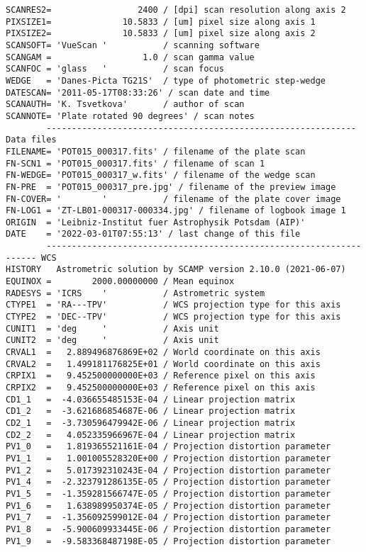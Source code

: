 \documentclass[11pt]{ivoa}
\begin{document}
\begin{lstlisting}
SCANRES2=                 2400 / [dpi] scan resolution along axis 2
PIXSIZE1=              10.5833 / [um] pixel size along axis 1
PIXSIZE2=              10.5833 / [um] pixel size along axis 2
SCANSOFT= 'VueScan '           / scanning software
SCANGAM =                  1.0 / scan gamma value
SCANFOC = 'glass   '           / scan focus
WEDGE   = 'Danes-Picta TG21S'  / type of photometric step-wedge
DATESCAN= '2011-05-17T08:33:26' / scan date and time
SCANAUTH= 'K. Tsvetkova'       / author of scan
SCANNOTE= 'Plate rotated 90 degrees' / scan notes
        ------------------------------------------------------------- Data files
FILENAME= 'POT015_000317.fits' / filename of the plate scan
FN-SCN1 = 'POT015_000317.fits' / filename of scan 1
FN-WEDGE= 'POT015_000317_w.fits' / filename of the wedge scan
FN-PRE  = 'POT015_000317_pre.jpg' / filename of the preview image
FN-COVER= '        '           / filename of the plate cover image
FN-LOG1 = 'ZT-LB01-000317-000334.jpg' / filename of logbook image 1
ORIGIN  = 'Leibniz-Institut fuer Astrophysik Potsdam (AIP)'
DATE    = '2022-03-01T07:55:13' / last change of this file
        -------------------------------------------------------------------- WCS
HISTORY   Astrometric solution by SCAMP version 2.10.0 (2021-06-07)
EQUINOX =        2000.00000000 / Mean equinox
RADESYS = 'ICRS    '           / Astrometric system
CTYPE1  = 'RA---TPV'           / WCS projection type for this axis
CTYPE2  = 'DEC--TPV'           / WCS projection type for this axis
CUNIT1  = 'deg     '           / Axis unit
CUNIT2  = 'deg     '           / Axis unit
CRVAL1  =   2.889496876869E+02 / World coordinate on this axis
CRVAL2  =   1.499181176825E+01 / World coordinate on this axis
CRPIX1  =   9.452500000000E+03 / Reference pixel on this axis
CRPIX2  =   9.452500000000E+03 / Reference pixel on this axis
CD1_1   =  -4.036655485153E-04 / Linear projection matrix
CD1_2   =  -3.621686854687E-06 / Linear projection matrix
CD2_1   =  -3.730596479942E-06 / Linear projection matrix
CD2_2   =   4.052335966967E-04 / Linear projection matrix
PV1_0   =   1.819365521161E-04 / Projection distortion parameter
PV1_1   =   1.001005528320E+00 / Projection distortion parameter
PV1_2   =   5.017392310243E-04 / Projection distortion parameter
PV1_4   =  -2.323791286135E-05 / Projection distortion parameter
PV1_5   =  -1.359281566747E-05 / Projection distortion parameter
PV1_6   =   1.638989950374E-05 / Projection distortion parameter
PV1_7   =  -1.356092599012E-04 / Projection distortion parameter
PV1_8   =  -5.900609933445E-06 / Projection distortion parameter
PV1_9   =  -9.583368487198E-05 / Projection distortion parameter

\end{lstlisting}
\end{document}
